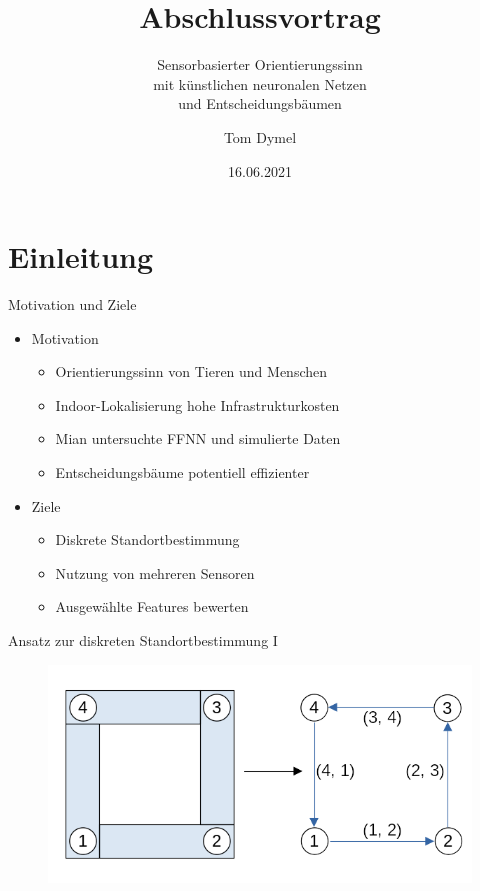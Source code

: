 \documentclass[10pt]{beamer}
\title{Abschlussvortrag}
\subtitle{Sensorbasierter Orientierungssinn\\mit künstlichen neuronalen Netzen\\und Entscheidungsbäumen}
\date{16.06.2021}
\author{Tom Dymel}
\institute{Masterarbeit\\Technische Universität Hamburg}
\begin{document}
\maketitle

\section{Einleitung}
\begin{frame}{Motivation und Ziele}
\begin{itemize}
    \item Motivation
    \begin{itemize}
        \item Orientierungssinn von Tieren und Menschen
        \item Indoor-Lokalisierung hohe Infrastrukturkosten
        \item Mian untersuchte FFNN und simulierte Daten
        \item Entscheidungsbäume potentiell effizienter
    \end{itemize}
    \item Ziele
    \begin{itemize}
        \item Diskrete Standortbestimmung %
        \item Nutzung von mehreren Sensoren
        \item Ausgewählte Features bewerten
    \end{itemize}
\end{itemize}
\end{frame}

\begin{frame}{Ansatz zur diskreten Standortbestimmung I}
    \begin{figure}
        \centering
        \includegraphics[width=\linewidth]{model/location_encoding.png}
    \end{figure}
\end{frame}
\end{document}
